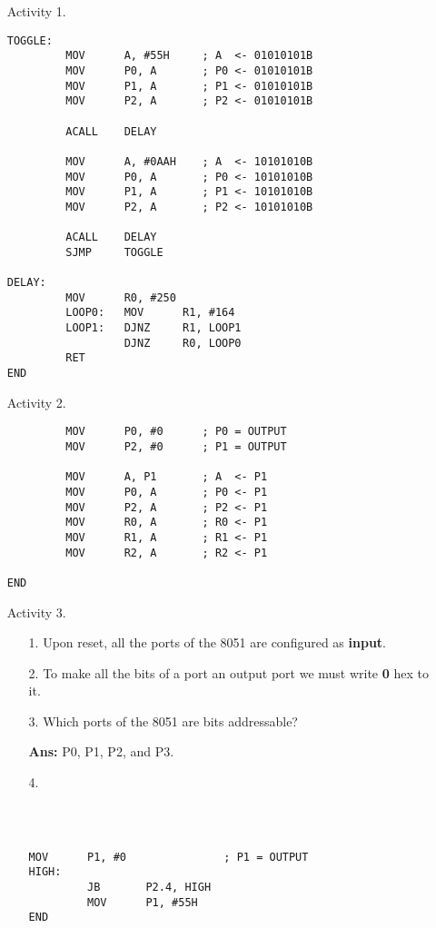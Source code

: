\documentclass[9pt]{article}
\begin{document}
\begin{enumerate}
   \item[Activity 1.] \begin{verbatim}
TOGGLE:
         MOV      A, #55H     ; A  <- 01010101B
         MOV      P0, A       ; P0 <- 01010101B
         MOV      P1, A       ; P1 <- 01010101B
         MOV      P2, A       ; P2 <- 01010101B
         
         ACALL    DELAY
         
         MOV      A, #0AAH    ; A  <- 10101010B
         MOV      P0, A       ; P0 <- 10101010B
         MOV      P1, A       ; P1 <- 10101010B
         MOV      P2, A       ; P2 <- 10101010B
         
         ACALL    DELAY			
         SJMP     TOGGLE
			
DELAY:
         MOV      R0, #250			
         LOOP0:   MOV      R1, #164		
         LOOP1:   DJNZ     R1, LOOP1
                  DJNZ     R0, LOOP0
         RET
END
         \end{verbatim}
   \item[Activity 2.] \begin{verbatim}
         MOV      P0, #0      ; P0 = OUTPUT
         MOV      P2, #0      ; P1 = OUTPUT

         MOV      A, P1       ; A  <- P1
         MOV      P0, A       ; P0 <- P1
         MOV      P2, A       ; P2 <- P1
         MOV      R0, A       ; R0 <- P1
         MOV      R1, A       ; R1 <- P1
         MOV      R2, A       ; R2 <- P1

END
         \end{verbatim}
   \item[Activity 3.]
      \begin{enumerate}
         \item[1.] Upon reset, all the ports of the 8051 are configured as
                   \textbf{input}.
         \item[2.] To make all the bits of a port an output port we must write
                   \textbf{0} hex to it.
         \item[3.] Which ports of the 8051 are bits addressable?
         
                   \textbf{Ans: } P0, P1, P2, and P3.
         \item[4.] \begin{verbatim}
         
         
         
MOV      P1, #0               ; P1 = OUTPUT
HIGH:
         JB       P2.4, HIGH
         MOV      P1, #55H
END         
         \end{verbatim}
      \end{enumerate}
\end{enumerate}
\end{document}
